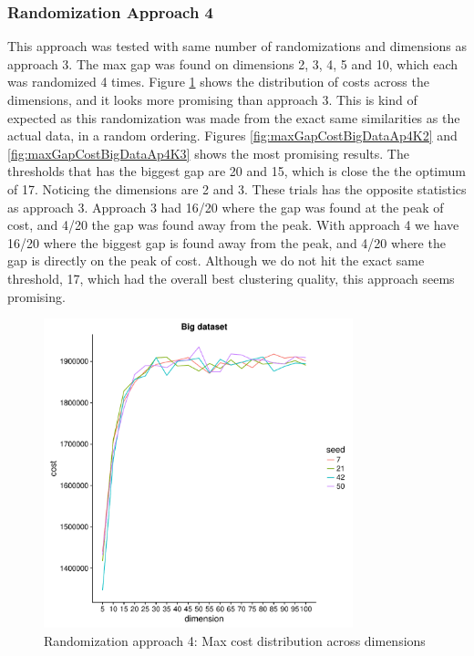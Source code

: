 \documentclass[a4paper,10pt]{article}
\theoremstyle{plain}
\theoremstyle{definition}
\begin{document}
\subsubsection{Randomization Approach 4}
This approach was tested with same number of randomizations and dimensions as approach 3. The max gap was found on dimensions 2, 3, 4, 5 and 10, which each was randomized 4 times. Figure \ref{fig:plotCostsRandomBigDataAp4} shows the distribution of costs across the dimensions, and it looks more promising than approach 3. This is kind of expected as this randomization was made from the exact same similarities as the actual data, in a random ordering. Figures \ref{fig:maxGapCostBigDataAp4K2} and \ref{fig:maxGapCostBigDataAp4K3} shows the most promising results. The thresholds that has the biggest gap are 20 and 15, which is close the the optimum of 17. Noticing the dimensions are 2 and 3. These trials has the opposite statistics as approach 3. Approach 3 had 16/20 where the gap was found at the peak of cost, and 4/20 the gap was found away from the peak. With approach 4 we have 16/20 where the biggest gap is found away from the peak, and 4/20 where the gap is directly on the peak of cost. Although we do not hit the exact same threshold, 17, which had the overall best clustering quality, this approach seems promising.

\begin{figure}[H]
	\centering
	\includegraphics[width=0.80\textwidth]{./plots/plotMaxCostRandomBig/plotCostsRandomBigData-Ap4.pdf}
	\caption{Randomization approach 4: Max cost distribution across dimensions}
	\label{fig:plotCostsRandomBigDataAp4}
\end{figure}
\end{document}
